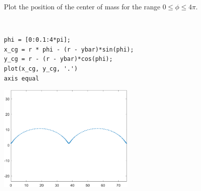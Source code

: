 Plot the position of the center of mass for the range $0 \leq \phi \leq 4\pi$. 

\begin{solution} \
\begin{lstlisting}
phi = [0:0.1:4*pi];
x_cg = r * phi - (r - ybar)*sin(phi);
y_cg = r - (r - ybar)*cos(phi);
plot(x_cg, y_cg, '.')
axis equal
\end{lstlisting}

\begin{center}
    \includegraphics[width=0.5\textwidth]{img/e3p1.png}
\end{center}
\end{solution}